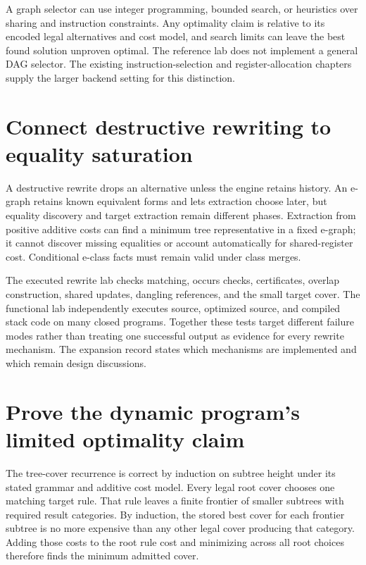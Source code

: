 A graph selector can use integer programming, bounded search, or heuristics over sharing and instruction constraints.
Any optimality claim is relative to its encoded legal alternatives and cost model, and search limits can leave the best found solution unproven optimal.
The reference lab does not implement a general DAG selector.
The existing instruction-selection and register-allocation chapters supply the larger backend setting for this distinction.

\section{Connect destructive rewriting to equality saturation}
\label{sec:ch88-egraphs}
A destructive rewrite drops an alternative unless the engine retains history.
An e-graph retains known equivalent forms and lets extraction choose later, but equality discovery and target extraction remain different phases.
Extraction from positive additive costs can find a minimum tree representative in a fixed e-graph; it cannot discover missing equalities or account automatically for shared-register cost.
Conditional e-class facts must remain valid under class merges.

The executed rewrite lab checks matching, occurs checks, certificates, overlap construction, shared updates, dangling references, and the small target cover.
The functional lab independently executes source, optimized source, and compiled stack code on many closed programs.
Together these tests target different failure modes rather than treating one successful output as evidence for every rewrite mechanism.
The expansion record states which mechanisms are implemented and which remain design discussions.

\section{Prove the dynamic program's limited optimality claim}
\label{sec:ch88-optimality}
The tree-cover recurrence is correct by induction on subtree height under its stated grammar and additive cost model.
Every legal root cover chooses one matching target rule.
That rule leaves a finite frontier of smaller subtrees with required result categories.
By induction, the stored best cover for each frontier subtree is no more expensive than any other legal cover producing that category.
Adding those costs to the root rule cost and minimizing across all root choices therefore finds the minimum admitted cover.

